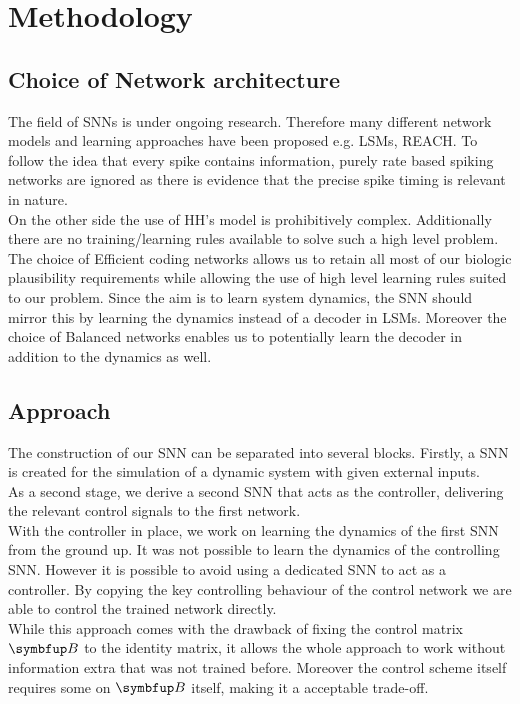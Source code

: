 \chapter{Methodology}




\section{Choice of Network architecture}

The field of \acp{SNN} is under ongoing research. Therefore many different network models and learning approaches have been proposed e.g. \acp{LSM}, REACH\cite{dewolf_spiking_2016}. To follow the idea that every spike contains information, purely rate based spiking networks are ignored as there is evidence that the precise spike timing is relevant in nature\cite{brette_philosophy_2015,putney_precise_2019}.\\

On the other side the use of \ac{HH}'s model is prohibitively complex. Additionally there are no training/learning rules available to solve such a high level problem.\\
The choice of Efficient coding networks allows us to retain all most of our biologic plausibility requirements while allowing the use of high level learning rules suited to our problem. Since the aim is to learn system dynamics, the \ac{SNN} should mirror this by learning the dynamics instead of a decoder in \acp{LSM}. Moreover the choice of Balanced networks enables us to potentially learn the decoder in addition to the dynamics as well.\\

\section{Approach}
The construction of our \ac{SNN} can be separated into several blocks. Firstly, a \ac{SNN} is created for the simulation of a dynamic system with given external inputs.\\
As a second stage, we derive a second \ac{SNN} that acts as the controller, delivering the relevant control signals to the first network.\\
With the controller in place, we work on learning the dynamics of the first \ac{SNN} from the ground up. It was not possible to learn the dynamics of the controlling \ac{SNN}. However it is possible to avoid using a dedicated \ac{SNN} to act as a controller. By copying the key controlling behaviour of the control network we are able to control the trained network directly.\\
While this approach comes with the drawback of fixing the control matrix $\bmu{B}$ to the identity matrix, it allows the whole approach to work without information extra that was not trained before. Moreover the control scheme itself requires some on $\bmu{B}$ itself, making it a acceptable trade-off.
